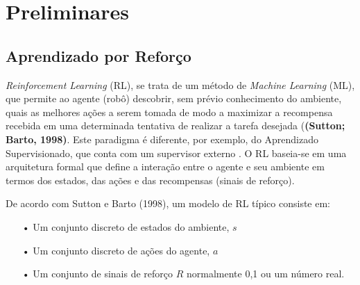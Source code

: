 \documentclass[a4paper]{ifacconf}
\begin{document}
\section{Preliminares}





\subsection{Aprendizado por Reforço}

\emph{Reinforcement Learning} (RL), se trata de um método de \emph{Machine Learning} (ML), que permite ao agente (robô) descobrir, sem prévio conhecimento do ambiente, quais as melhores ações a serem tomada de modo a maximizar a recompensa recebida em uma determinada tentativa de realizar a tarefa desejada (\textbf{(Sutton; Barto, 1998)}. Este paradigma é diferente, por exemplo, do Aprendizado Supervisionado, que conta com um supervisor externo \cite{intro_to_rl,rl_rob_survey,ql_pid_robotics,ql_model}. O RL baseia-se em uma arquitetura formal que define a interação entre o agente e seu ambiente em termos dos estados, das ações e das recompensas (sinais de reforço).

De acordo com Sutton e Barto (1998), um modelo de RL típico consiste em:
\begin{itemize}
  \item[•]Um conjunto discreto de estados do ambiente, $s$
  \item[•] Um conjunto discreto de ações do agente, $a$
  \item[•] Um conjunto de sinais de reforço $R$ normalmente {0,1} ou um número real.
\end{itemize}
\end{document}
